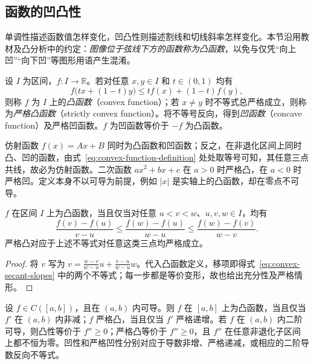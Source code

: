 \documentclass[UTF8,12pt,a4paper,fontset=fandol]{ctexbook}
\begin{document}
\subsection{函数的凹凸性}
\label{subsec:convexity-and-concavity}

单调性描述函数值怎样变化，凹凸性则描述割线和切线斜率怎样变化。本节沿用教材及凸分析中的约定：\emph{图像位于弦线下方的函数称为凸函数}，以免与仅凭“向上凹”“向下凹”等图形用语产生混淆。

\begin{definition}
\label{def:convex-and-concave-functions}
设 $I$ 为区间，$f:I\to\mathbb{R}$。若对任意 $x,y\in I$ 和 $t\in(0,1)$ 均有
\begin{equation}
    f\bigl(tx+(1-t)y\bigr)\leq tf(x)+(1-t)f(y),
    \label{eq:convex-function-definition}
\end{equation}
则称 $f$ 为 $I$ 上的\emph{凸函数}（convex function）；若 $x\neq y$ 时不等式总严格成立，则称为\emph{严格凸函数}（strictly convex function）。将不等号反向，得到\emph{凹函数}（concave function）及严格凹函数。$f$ 为凹函数等价于 $-f$ 为凸函数。
\end{definition}

仿射函数 $f(x)=Ax+B$ 同时为凸函数和凹函数；反之，在非退化区间上同时凸、凹的函数，由式~\eqref{eq:convex-function-definition} 处处取等号可知，其任意三点共线，故必为仿射函数。二次函数 $ax^2+bx+c$ 在 $a>0$ 时严格凸，在 $a<0$ 时严格凹。定义本身不以可导为前提，例如 $|x|$ 是实轴上的凸函数，却在零点不可导。

\begin{lemma}[割线斜率的刻画]
\label{lem:convex-secant-slopes}
$f$ 在区间 $I$ 上为凸函数，当且仅当对任意 $u<v<w$、$u,v,w\in I$，均有
\begin{equation}
    \frac{f(v)-f(u)}{v-u}
    \leq\frac{f(w)-f(u)}{w-u}
    \leq\frac{f(w)-f(v)}{w-v}.
    \label{eq:convex-secant-slopes}
\end{equation}
严格凸对应于上述不等式对任意这类三点均严格成立。
\end{lemma}

\begin{proof}
将 $v$ 写为 $v=\frac{w-v}{w-u}u+\frac{v-u}{w-u}w$。代入凸函数定义，移项即得式~\eqref{eq:convex-secant-slopes} 中的两个不等式；每一步都是等价变形，故也给出充分性及严格情形。
\end{proof}

\begin{theorem}[凹凸性的导数判别]
\label{thm:convexity-derivative-tests}
设 $f\in C([a,b])$，且在 $(a,b)$ 内可导。则 $f$ 在 $[a,b]$ 上为凸函数，当且仅当 $f'$ 在 $(a,b)$ 内非减；$f$ 严格凸，当且仅当 $f'$ 严格递增。若 $f$ 在 $(a,b)$ 内二阶可导，则凸性等价于 $f''\geq0$；严格凸等价于 $f''\geq0$，且 $f''$ 在任意非退化子区间上都不恒为零。凹性和严格凹性分别对应于导数非增、严格递减，或相应的二阶导数反向不等式。
\end{theorem}
\end{document}
